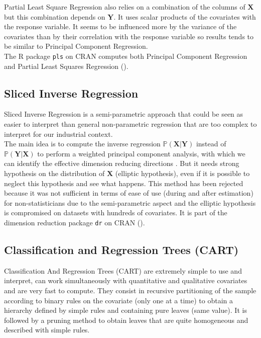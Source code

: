 \documentclass[12pt,a4paper]{report}
\begin{document}
	Partial Least Square Regression \cite{abdi2003partial,geladi1986partial} also relies on a combination of the columns of  $\boldsymbol{X}$ but this combination depends on $\boldsymbol{Y}$.
		It uses scalar products of the covariates with the response variable.	
	It seems to be influenced more by the variance of the covariates than by their correlation with the response variable so results tends to be similar to Principal Component Regression.
	\\
	
	The R package {\tt pls} on CRAN computes both Principal Component Regression and Partial Least Squares Regression (\cite{packagepls}).
		
	\subsection{Sliced Inverse Regression}
		Sliced Inverse Regression is a semi-parametric approach that could be seen as easier to interpret than general non-parametric regression \cite{eubank1999nonparametric,hardle1990applied} that are too complex to interpret for our industrial context. \\
		
		The main idea is to compute the inverse regression $\mathbb{P}(\boldsymbol{X}|\boldsymbol{Y})$ instead of $\mathbb{P}(\boldsymbol{Y}|\boldsymbol{X})$ to perform a weighted principal component analysis, with which we can identify the effective dimension reducing directions \cite{li1991sliced}. But it needs strong hypothesis on the distribution of $\boldsymbol{X}$ (elliptic hypothesis), even if it is possible to neglect this hypothesis \cite{saracco1999regression} and see what happens. This method has been rejected because it was not sufficient in terms of ease of use (during and after estimation) for non-statisticians due to the semi-parametric aspect and the elliptic hypothesis is compromised on datasets with hundreds of covariates. It is part of the dimension reduction package {\tt dr} on CRAN (\cite{packagedr}).
			
		
			
		
\subsection{Classification and Regression Trees (CART)}

	
		Classification And Regression Trees (CART) \cite{breiman1984classification} are extremely simple to use and interpret, can work simultaneously with quantitative and qualitative covariates and are very fast to compute. They consist in recursive partitioning of the sample according to binary rules on the covariate (only one at a time) to obtain a hierarchy defined by simple rules and containing pure leaves (same value). It is followed by a pruning method to obtain leaves that are quite homogeneous and described with simple rules.\\
		
\end{document}
